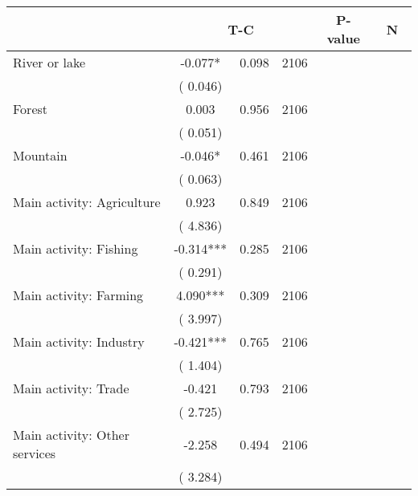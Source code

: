 
\begin{tabular}{l*{3}{c}}\hline&\multicolumn{3}{c}{T-C}&\multicolumn{3}{c}{P-value}&\multicolumn{3}{c}{N} \\ \hline
 River or lake                 &             -0.077*          &        0.098 & 2106          \\ 
                               &        (       0.046)             &                        &                              \\ 
 Forest                 &              0.003          &        0.956 & 2106          \\ 
                               &        (       0.051)             &                        &                              \\ 
 Mountain                 &             -0.046*          &        0.461 & 2106          \\ 
                               &        (       0.063)             &                        &                              \\ 
 Main activity: Agriculture                  &              0.923          &        0.849 & 2106          \\ 
                               &        (       4.836)             &                        &                              \\ 
 Main activity: Fishing                 &             -0.314***          &        0.285 & 2106          \\ 
                               &        (       0.291)             &                        &                              \\ 
 Main activity: Farming                 &              4.090***          &        0.309 & 2106          \\ 
                               &        (       3.997)             &                        &                              \\ 
 Main activity: Industry                 &             -0.421***          &        0.765 & 2106          \\ 
                               &        (       1.404)             &                        &                              \\ 
 Main activity: Trade                 &             -0.421          &        0.793 & 2106          \\ 
                               &        (       2.725)             &                        &                              \\ 
 Main activity: Other services                 &             -2.258          &        0.494 & 2106          \\ 
                               &        (       3.284)             &                        &                              \\ 
\hline \end{tabular}                                                                                              
